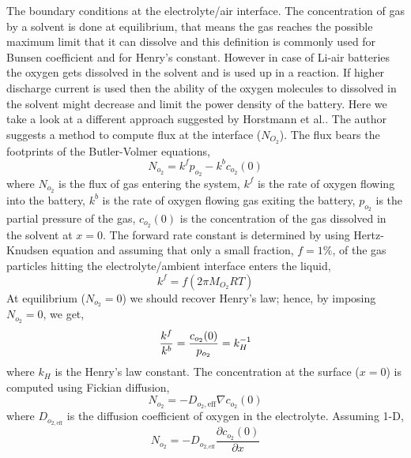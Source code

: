 \documentclass[Notes.tex]{subfiles}
\begin{document}
The boundary conditions at the electrolyte/air interface. The concentration of gas by a solvent is done at equilibrium, that means the gas reaches the possible maximum limit that it can dissolve and this definition is commonly used for Bunsen coefficient and for Henry's constant. However in case of Li-air batteries the oxygen gets dissolved in the solvent and is used up in a reaction. If higher discharge current is used then the ability of the oxygen molecules to dissolved in the solvent might decrease and limit the power density of the battery.
Here we take a look at a different approach suggested by Horstmann et al.\cite{Horstmann2013}. The author suggests a method to compute flux at the interface ($N_{O_2}$). The flux bears the footprints of the Butler-Volmer equations,
\begin{equation}
N_{o_2} = k^fp_{o_2} - k^b c_{o_2}(0)
\label{eq:oxygen_flux}
\end{equation}
where $N_{o_2}$ is the flux of gas entering the system, $k^f$ is the rate of oxygen flowing into the battery, $k^b$ is the rate of oxygen flowing gas exiting the battery, $p_{o_2}$ is the partial pressure of the gas, $c_{o_2}(0)$ is the concentration of the gas dissolved in the solvent at $x=0$. 
The forward rate constant is determined by using Hertz-Knudsen equation and assuming that only a small fraction, $f = 1\%$, of the gas particles hitting the electrolyte/ambient interface enters the liquid, 
\begin{equation}
k^f = f\left(2\pi M_{O_2}RT\right)
\end{equation}
At equilibrium ($N_{o_2} = 0$) we should recover Henry's law; hence, by
imposing $N_{o_2} = 0$, we get, 
\begin{equation}
\frac{k^f}{k^b} = \frac{c_{o_2}(0)}{p_{o_2}} = k_H^{-1} \label{eq:oxygen_flux_equilibrium}\\
\end{equation}
where $k_H$ is the Henry's law constant. The concentration at the surface ($x=0$) is computed using Fickian diffusion,
\begin{equation}
N_{o_2}  = -D_{o_2,\textrm{eff}}\nabla c_{o_2}(0) \label{eq:Fickian_diffusion_x_0}
\end{equation}
where $D_{o_{2,\textrm{eff}}}$ is the diffusion coefficient of oxygen in the electrolyte. Assuming 1-D,
\begin{equation}
N_{o_2}  = -D_{o_{2,\textrm{eff}}}\frac{\partial c_{o_2}(0)}{\partial x}
\end{equation}
\end{document}
